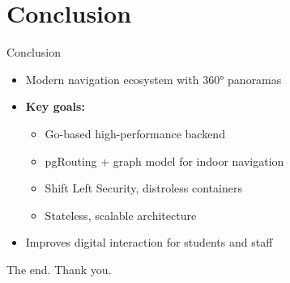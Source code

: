 \documentclass[10pt, aspectratio=169]{beamer}
\begin{document}
\section*{Conclusion}

\begin{frame}{Conclusion}
	\begin{itemize}
		\item Modern navigation ecosystem with 360° panoramas
		\item \textbf{Key goals:}
		      \begin{itemize}
			      \item Go-based high-performance backend
			      \item pgRouting + graph model for indoor navigation
			      \item Shift Left Security, distroless containers
			      \item Stateless, scalable architecture
		      \end{itemize}
		\item Improves digital interaction for students and staff
	\end{itemize}
\end{frame}

\begin{frame}{The end.}
	\centering
	\vfill
	\Large{Thank you.}
	\vfill
\end{frame}
\end{document}
